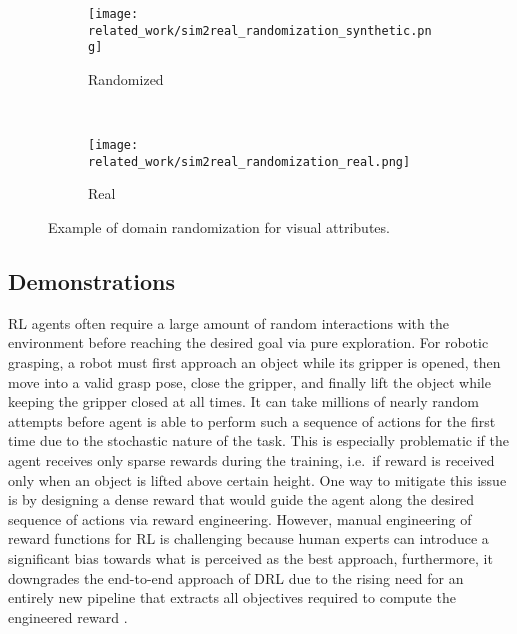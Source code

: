 \begin{figure}[ht]
    \centering
    \begin{subfigure}[ht]{0.745\textwidth}
        \centering
        \texttt{[image: related\_work/sim2real\_randomization\_synthetic.png]}
        \caption*{Randomized}
    \end{subfigure}%
    ~
    \begin{subfigure}[ht]{0.245\textwidth}
        \centering
        \texttt{[image: related\_work/sim2real\_randomization\_real.png]}
        \caption*{Real}
    \end{subfigure}%
    \caption{Example of domain randomization for visual attributes.~\protect\cite{tobin_domain_2017}}
    \label{fig:sim2real_domain_randomization}
\end{figure}


\subsection{Demonstrations}

RL agents often require a large amount of random interactions with the environment before reaching the desired goal via pure exploration. For robotic grasping, a robot must first approach an object while its gripper is opened, then move into a valid grasp pose, close the gripper, and finally lift the object while keeping the gripper closed at all times. It can take millions of nearly random attempts before agent is able to perform such a sequence of actions for the first time due to the stochastic nature of the task. This is especially problematic if the agent receives only sparse rewards during the training, i.e.~if reward is received only when an object is lifted above certain height. One way to mitigate this issue is by designing a dense reward that would guide the agent along the desired sequence of actions via reward engineering. However, manual engineering of reward functions for RL is challenging because human experts can introduce a significant bias towards what is perceived as the best approach, furthermore, it downgrades the end-to-end approach of DRL due to the rising need for an entirely new pipeline that extracts all objectives required to compute the engineered reward \cite{singh_end--end_2019}.

